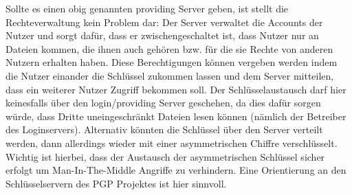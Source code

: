 \documentclass[12pt,a4paper,bibliography=totocnumbered,listof=totocnumbered]{scrartcl}
\begin{document}
Sollte es einen obig genannten providing Server geben, ist stellt die Rechteverwaltung kein Problem dar: Der Server verwaltet die Accounts der Nutzer und sorgt dafür, dass er zwischengeschaltet ist, dass Nutzer nur an Dateien kommen, die ihnen auch gehören bzw. für die sie Rechte von anderen Nutzern erhalten haben. Diese Berechtigungen können vergeben werden indem die Nutzer einander die Schlüssel zukommen lassen und dem Server mitteilen, dass ein weiterer Nutzer Zugriff bekommen soll. Der Schlüsselaustausch darf hier keinesfalls über den login/providing Server geschehen, da dies dafür sorgen würde, dass Dritte uneingeschränkt Dateien lesen können (nämlich der Betreiber des Loginservers). Alternativ könnten die Schlüssel über den Server verteilt werden, dann allerdings wieder mit einer asymmetrischen Chiffre verschlüsselt. Wichtig ist hierbei, dass der Austausch der asymmetrischen Schlüssel sicher erfolgt um Man-In-The-Middle Angriffe zu verhindern. Eine Orientierung an den Schlüsselservern des PGP Projektes ist hier sinnvoll.
\end{document}
